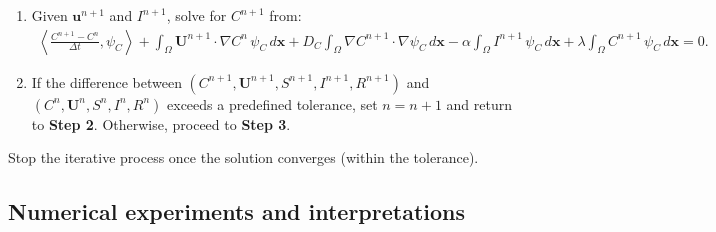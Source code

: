 \documentclass[10pt,number,preprint,times]{elsarticle}
\numberwithin{equation}{section} %
\begin{document}
\begin{algorithm}[H]
\begin{description}
\begin{enumerate}
			\item Given $\boldsymbol{u}^{n+1}$ and $I^{n+1}$, solve for $C^{n+1}$ from:
			\begin{eqnarray*} 
				\left\langle \frac{C^{n+1}-C^{n}}{\Delta t}, \psi_C \right\rangle 
				+ \int_{\Omega}  \boldsymbol{U}^{n+1}\cdot\nabla C^n\, \psi_C\, d\mathbf{x}+ D_C\int_{\Omega}\nabla C^{n+1} \cdot\nabla \psi_C\, d\mathbf{x}%
				- \alpha\int_{\Omega} I^{n+1}\, \psi_C\, d\mathbf{x} + \lambda \int_{\Omega} C^{n+1} \,\psi_C \, d\mathbf{x}  
				= 0.
			\end{eqnarray*}
			
			\item If the difference between $\left(C^{n+1}, \boldsymbol{U}^{n+1}, S^{n+1} , I^{n+1} , R^{n+1}\right)$ and $\left(C^{n}, \boldsymbol{U}^{n}, S^{n} , I^{n} , R^{n}\right)$ exceeds a predefined tolerance, set $n = n + 1$ and return to \textbf{Step 2}. Otherwise, proceed to \textbf{Step 3}.
		\end{enumerate}
		
		\item[Step 3. ] Stop the iterative process once the solution converges (within the tolerance).
	\end{description}
	\label{algorithm}
\end{algorithm}

	
	\subsection{Numerical experiments and interpretations}
	
\end{document}
